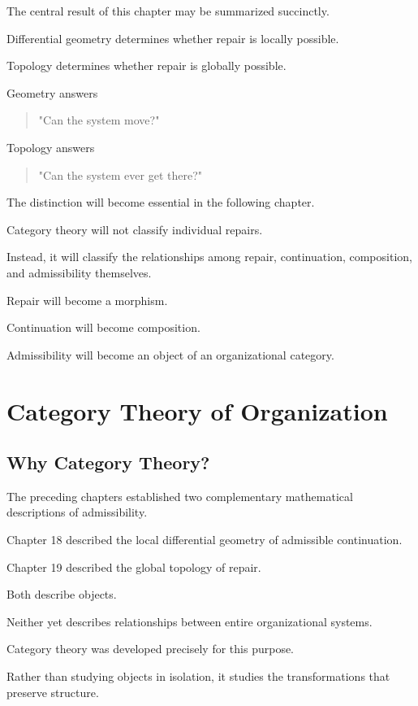 \documentclass[11pt,oneside]{book}
\numberwithin{equation}{chapter}
\theoremstyle{definition}
\theoremstyle{plain}
\begin{document}
The central result of this chapter may be summarized succinctly.

Differential geometry determines whether repair is locally possible.

Topology determines whether repair is globally possible.

Geometry answers

\begin{quote}
"Can the system move?"

\end{quote}

Topology answers

\begin{quote}
"Can the system ever get there?"

\end{quote}

The distinction will become essential in the following chapter.

Category theory will not classify individual repairs.

Instead, it will classify the relationships among repair, continuation,
composition, and admissibility themselves.

Repair will become a morphism.

Continuation will become composition.

Admissibility will become an object of an organizational category.

\chapter{Category Theory of Organization}

\section{Why Category Theory?}

The preceding chapters established two complementary mathematical
descriptions of admissibility.

Chapter 18 described the local differential geometry of admissible
continuation.

Chapter 19 described the global topology of repair.

Both describe objects.

Neither yet describes relationships between entire organizational systems.

Category theory was developed precisely for this purpose.

Rather than studying objects in isolation, it studies the transformations
that preserve structure.
\end{document}
